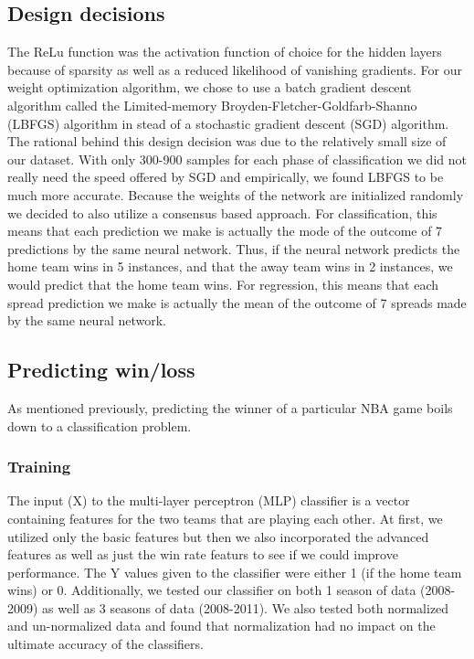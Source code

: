 \documentclass{article}
\begin{document}
\subsection{Design decisions}
The ReLu function was the activation function of choice for the hidden layers because of sparsity as well as a reduced likelihood of vanishing gradients. For our weight optimization algorithm, we chose to use a batch gradient descent algorithm called the Limited-memory Broyden-Fletcher-Goldfarb-Shanno (LBFGS) algorithm in stead of a stochastic gradient descent (SGD) algorithm. The rational behind this design decision was due to the relatively small size of our dataset. With only 300-900 samples for each phase of classification we did not really need the speed offered by SGD and empirically, we found LBFGS to be much more accurate. Because the weights of the network are initialized randomly we decided to also utilize a consensus based approach. For classification, this means that each prediction we make is actually the mode of the outcome of 7 predictions by the same neural network. Thus, if the neural network predicts the home team wins in 5 instances, and that the away team wins in 2 instances, we would predict that the home team wins. For regression, this means that each spread prediction we make is actually the mean of the outcome of 7 spreads made by the same neural network.

\subsection{Predicting win/loss}
As mentioned previously, predicting the winner of a particular NBA game boils down to a classification problem.

\subsubsection{Training}
The input (X) to the multi-layer perceptron (MLP) classifier is a vector containing features for the two teams that are playing each other. At first, we utilized only the basic features but then we also incorporated the advanced features as well as just the win rate featurs to see if we could improve performance. The Y values given to the classifier were either 1 (if the home team wins) or 0. Additionally, we tested our classifier on both 1 season of data (2008-2009) as well as 3 seasons of data (2008-2011). We also tested both normalized and un-normalized data and found that normalization had no impact on the ultimate accuracy of the classifiers.
\end{document}
